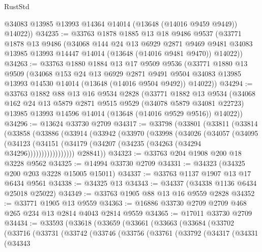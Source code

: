 \begin{lexlean}{RustStd}
\begin{coremodule}
        @34083
        @13985
        @13993
        @14364
        @14014
        (@13648 (@14016 @9459 @9449))
        @14022))
@34235 := @33763
    @1878
    @1885
    @13
    @18
    @9486
    @9537
    (@33771
      @1878
      @13
      @9486
      (@34068
        @144
        @24
        @13
        @6929
        @2871
        @9469
        @9481
        @34083
        @13985
        @13993
        @14447
        @14014
        (@13648 (@14016 @9481 @9470))
        @14022))
@34263 := @33763
    @1880
    @1884
    @13
    @17
    @9509
    @9536
    (@33771
      @1880
      @13
      @9509
      (@34068
        @153
        @24
        @13
        @6929
        @2871
        @9491
        @9504
        @34083
        @13985
        @13993
        @14530
        @14014
        (@13648 (@14016 @9504 @9492))
        @14022))
@34294 := @33763
    @1882
    @88
    @13
    @16
    @9534
    @2828
    (@33771
      @1882
      @13
      @9534
      (@34068
        @162
        @24
        @13
        @5879
        @2871
        @9515
        @9529
        (@34078 @5879 @34081 @22723)
        @13985
        @13993
        @14596
        @14014
        (@13648 (@14016 @9529 @9516))
        @14022))
@34296 := @13624 @33730 @2709
@34317 := @33798
    (@33801
      (@33811
        (@33814
          (@33858
            (@33886
              (@33914
                (@33942
                  (@33970
                    (@33998
                      (@34026
                        (@34057
                          (@34095
                            (@34123
                              (@34151
                                (@34179 (@34207 (@34235 (@34263 (@34294 @34296)))))))))))))))))
        @28841))
@34323 := @33763 @204 @1908 @200 @18 @3228 @9562
@34325 := @14994 @33730 @2709
@34331 := @34323 (@34325 @200 @203 @3228 @15005 @15011)
@34337 := @33763 @1137 @1907 @13 @17 @6434 @9561
@34338 := @34325 @13
@34343 := @34337 (@34338 @1136 @6434 @25018 @25022)
@34349 := @33763 @1905 @88 @13 @16 @9559 @2828
@34352 := @33771 @1905 @13 @9559
@34363 := @16886 @33730 @2709 @2709 @468 @265 @234 @13 @2814 @4043 @2814 @9559
@34365 := @17011 @33730 @2709
@34434 := @33593
    (@33618
      (@33659
        (@33661
          (@33663
            (@33684
              (@33702
                (@33716
                  (@33731
                    (@33742
                      (@33746
                        (@33756
                          (@33761
                            (@33792
                              (@34317
                                (@34331
                                  (@34343

\end{coremodule}
\end{lexlean}
